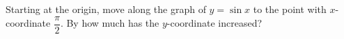 Starting at the origin, move along the graph of $y=\sin x$ to the point with $x$-coordinate $\dfrac{\pi}{2}$. By how much has the $y$-coordinate increased?
